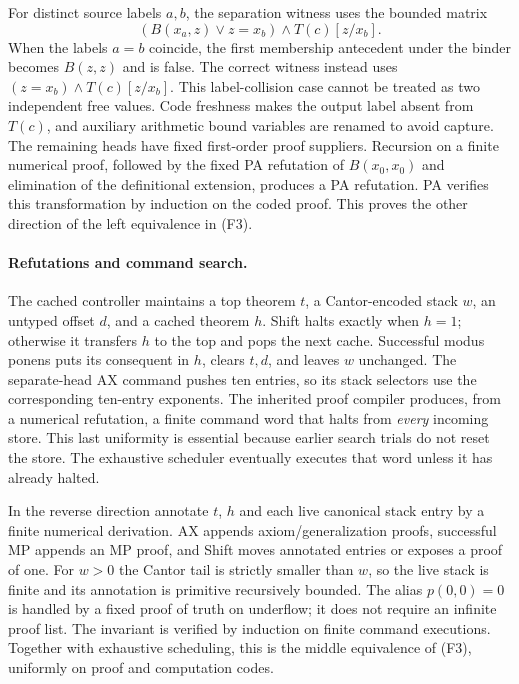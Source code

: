 For distinct source labels $a,b$, the separation witness uses the bounded
matrix
\[
          (B(x_a,z)\lor z=x_b)\wedge T(c)[z/x_b].
\]
When the labels $a=b$ coincide, the first membership antecedent under the
binder becomes $B(z,z)$ and is false. The correct witness instead uses
$(z=x_b)\wedge T(c)[z/x_b]$. This label-collision case cannot be treated as
two independent free values. Code freshness makes the output label absent
from $T(c)$, and auxiliary arithmetic bound variables are renamed to avoid
capture. The remaining heads have fixed first-order proof suppliers.
Recursion on a finite numerical proof, followed by the fixed PA refutation
of $B(x_0,x_0)$ and elimination of the definitional extension, produces
a PA refutation. PA verifies this transformation by induction on the
coded proof. This proves the other direction of the left equivalence
in (F3).

\paragraph{Refutations and command search.}
The cached controller maintains a top theorem $t$, a Cantor-encoded stack
$w$, an untyped offset $d$, and a cached theorem $h$. Shift halts exactly
when $h=1$; otherwise it transfers $h$ to the top and pops the next cache.
Successful modus ponens puts its consequent in $h$, clears $t,d$, and
leaves $w$ unchanged. The separate-head AX command pushes ten entries,
so its stack selectors use the corresponding ten-entry exponents.
The inherited proof compiler produces, from a numerical refutation, a
finite command word that halts from \emph{every} incoming store. This
last uniformity is essential because earlier search trials do not reset
the store. The exhaustive scheduler eventually executes that word unless
it has already halted.

In the reverse direction annotate $t$, $h$ and each live canonical stack
entry by a finite numerical derivation. AX appends axiom/generalization
proofs, successful MP appends an MP proof, and Shift moves annotated
entries or exposes a proof of one. For $w>0$ the Cantor tail is strictly
smaller than $w$, so the live stack is finite and its annotation is
primitive recursively bounded. The alias $p(0,0)=0$ is handled by a fixed
proof of truth on underflow; it does not require an infinite proof list.
The invariant is verified by induction on finite command executions.
Together with exhaustive scheduling, this is the middle equivalence
of (F3), uniformly on proof and computation codes.

